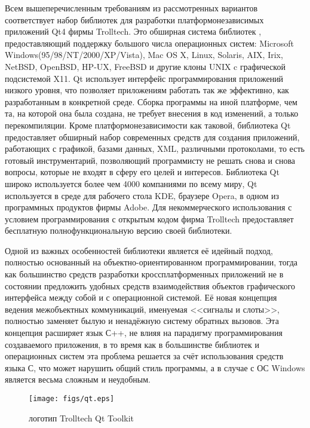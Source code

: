 \documentclass[a4paper,12pt]{report}
\begin{document}
Всем вышеперечисленным требованиям из рассмотренных вариантов соответствует набор библиотек для разработки платформонезависимых приложений Qt4 фирмы Trolltech. Это обширная система библиотек , предоставляющий поддержку большого числа операционных систем: Microsoft Windows(95/98/NT/2000/XP/Vista), Mac OS X, Linux, Solaris, AIX, Irix, NetBSD, OpenBSD, HP-UX, FreeBSD и другие клоны UNIX c графической подсистемой X11. Qt использует интерфейс программирования приложений низкого уровня, что позволяет приложениям работать так же эффективно, как разработанным в конкретной среде. Сборка программы на иной платформе, чем та, на которой она была создана, не требует внесения в код изменений, а только перекомпиляции. Кроме платформонезависимости как таковой, библиотека Qt предоставляет обширный набор современных средств для создания приложений, работающих с графикой, базами данных, XML, различными протоколами, то есть готовый инструментарий, позволяющий программисту не решать снова и снова вопросы, которые не входят в сферу его целей и интересов. Библиотека Qt широко используется более чем 4000 компаниями по всему миру, Qt используется в среде для рабочего стола KDE, браузере Opera, в одном из программных продуктов фирмы Adobe. Для некоммерческого использования с условием программирования с открытым кодом фирма Trolltech предоставляет бесплатную полнофункциональную версию своей библиотеки. 

Одной из важных особенностей библиотеки является её идейный подход, полностью основанный на объектно-ориентированном программировании, тогда как большинство средств разработки кроссплатформенных приложений не в состоянии предложить удобных средств взаимодействия объектов графического интерфейса между собой и с операционной системой. Её новая концепция ведения межобъектных коммуникаций, именуемая <<сигналы и слоты>>, полностью заменяет былую и ненадёжную систему обратных вызовов. Эта концепция расширяет язык С++, не влияя на парадигму программирования создаваемого приложения, в то время как в большинстве библиотек и операционных систем эта проблема решается за счёт использования средств языка С, что может нарушить общий стиль программы, а в случае с ОС Windows является весьма сложным и неудобным.

\begin{center}
\begin{figure}[h]
\begin{center}
\texttt{[image: figs/qt.eps]}
\end{center}\caption{логотип Trolltech Qt Toolkit}
\label{qtlogo}
\end{figure}
\end{center}
\end{document}
